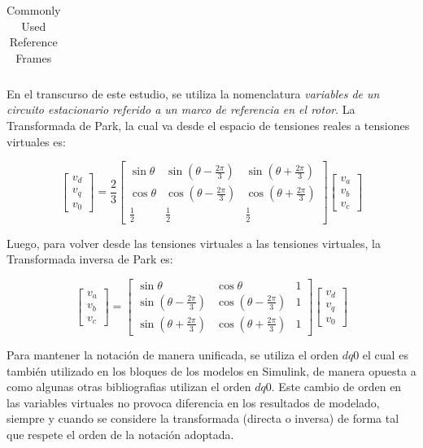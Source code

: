 \documentclass[blue,fullpaper]{ludusofficial}  %
\begin{document}
\begin{table}[htpb]
\begin{tabular}{@{}llcc@{}}
        \bottomrule
    \end{tabular}
    \caption{Commonly Used Reference Frames}
    \label{tab:reference_frames}
\end{table}

En el transcurso de este estudio, se utiliza la nomenclatura \textit{variables de un circuito estacionario referido a un marco de referencia en el rotor}. La Transformada de Park, la cual va desde el espacio de tensiones reales a tensiones virtuales es:

\[
\begin{bmatrix}
    v_d \\ v_q \\v_0
\end{bmatrix} 
=
\frac{2}{3} 
\begin{bmatrix}
    \sin \theta & \sin\left(\theta - \frac{2\pi}{3}\right) & \sin\left(\theta + \frac{2\pi}{3}\right) \\[1em]
    \cos \theta & \cos\left(\theta - \frac{2\pi}{3}\right) & \cos\left(\theta + \frac{2\pi}{3}\right) \\[1em]
    \frac{1}{2} & \frac{1}{2} & \frac{1}{2}
\end{bmatrix}
\begin{bmatrix}
    v_a \\ v_b \\v_c
\end{bmatrix} 
\]

Luego, para volver desde las tensiones virtuales a las tensiones virtuales, la Transformada inversa de Park es:

\[
\begin{bmatrix}
    v_a \\ v_b \\v_c
\end{bmatrix} 
=
\begin{bmatrix}
    \sin \theta & \cos \theta  & 1 \\[1em]
     \sin\left(\theta - \frac{2\pi}{3}\right) & \cos\left(\theta - \frac{2\pi}{3}\right) & 1 \\[1em]
     \sin\left(\theta + \frac{2\pi}{3}\right) & \cos\left(\theta + \frac{2\pi}{3}\right) & 1
\end{bmatrix}
\begin{bmatrix}
    v_d \\ v_q \\v_0
\end{bmatrix} 
\]

Para mantener la notación de manera unificada, se utiliza el orden $dq0$ el cual es también utilizado en los bloques de los modelos en Simulink, de manera opuesta a como algunas otras bibliografias utilizan el orden $dq0$. Este cambio de orden en las variables virtuales no provoca diferencia en los resultados de modelado, siempre y cuando se considere la transformada (directa o inversa) de forma tal que respete el orden de la notación adoptada.
\end{document}
